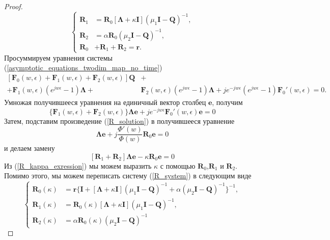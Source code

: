 \begin{proof}
\begin{equation} \label{R_system}
	\left\{
	\begin{aligned}
		\boldsymbol{R}_{1}& = \boldsymbol{R}_{0}[\boldsymbol{\Lambda} + \kappa\boldsymbol{I}](\mu_{1}\boldsymbol{I} - \boldsymbol{Q})^{-1},\\
		\boldsymbol{R}_{2}& = \alpha\boldsymbol{R}_{0}(\mu_2\boldsymbol{I} - \boldsymbol{Q})^{-1},\\
		\boldsymbol{R}_{0}& + \boldsymbol{R}_{1} + \boldsymbol{R}_{2} = \boldsymbol{r}.
	\end{aligned}
	\right.
\end{equation}
Просуммируем уравнения системы (\ref{asymptotic_equations_twodim_map_no_time})
\begin{equation*}
	\begin{split}
		[\boldsymbol{F}_{0}(w,\epsilon) + \boldsymbol{F}_{1}(w,\epsilon) +  \boldsymbol{F}_{2}(w,\epsilon)]\boldsymbol{Q} &+\\  + 
		\boldsymbol{F}_{1}(w,\epsilon)(e^{jw\epsilon} - 1)\boldsymbol{\Lambda} + & \boldsymbol{F}_{2}(w,\epsilon)(e^{jw\epsilon} - 1)\boldsymbol{\Lambda} + je^{-jw\epsilon}(e^{jw\epsilon} - 1)\boldsymbol{F}_{0}'(w,\epsilon) = 0.
	\end{split}
\end{equation*}
Умножая получившееся уравнения на единичный вектор столбец $\boldsymbol{e}$, получим
\begin{equation*}
	\{\boldsymbol{F}_{1}(w,\epsilon) + \boldsymbol{F}_{2}(w,\epsilon)\}\boldsymbol{\Lambda}\boldsymbol{e} + je^{-jw\epsilon}\boldsymbol{F}_{0}'(w,\epsilon)\boldsymbol{e} = 0
\end{equation*}
Затем, подставим произведение (\ref{R_solution}) в получившееся уравнение
\begin{equation*}
	[\boldsymbol{R}_{1} + \boldsymbol{R}_{2}]\boldsymbol{\Lambda}\boldsymbol{e} + j\frac{\Phi'(w)}{\Phi(w)}\boldsymbol{R}_{0}\boldsymbol{e} = 0
\end{equation*}
 и делаем замену
 \begin{equation} \label{R_kappa_exression}
 	[\boldsymbol{R}_{1} + \boldsymbol{R}_{2}]\boldsymbol{\Lambda}\boldsymbol{e} -\kappa\boldsymbol{R}_{0}\boldsymbol{e} = 0
\end{equation}
Из (\ref{R_kappa_exression}) мы можем выразить $\kappa$ с помощью $\boldsymbol{R}_{0}$,$\boldsymbol{R}_{1}$ и $\boldsymbol{R}_{2}$. Помимо этого, мы можем переписать систему (\ref{R_system}) в следующим виде
\begin{equation*}
	\left\{
	\begin{aligned}
		\boldsymbol{R}_{0}(\kappa) & = \boldsymbol{r}\{\boldsymbol{I} + [\boldsymbol{\Lambda} + \kappa\boldsymbol{I}](\mu_{1}\boldsymbol{I}-\boldsymbol{Q})^{-1}+\alpha(\mu_{2}\boldsymbol{I}-\boldsymbol{Q})^{-1}\}^{-1},\\
		\boldsymbol{R}_{1}(\kappa) & = \boldsymbol{R}_{0}(\kappa)[\boldsymbol{\Lambda} + \kappa\boldsymbol{I}](\mu_{1}\boldsymbol{I} - \boldsymbol{Q})^{-1},\\
		\boldsymbol{R}_{2}(\kappa) & = \alpha\boldsymbol{R}_{0}(\kappa)(\mu_{2}\boldsymbol{I} - \boldsymbol{Q})^{-1}
	\end{aligned}
	\right.
\end{equation*}
\end{proof}
